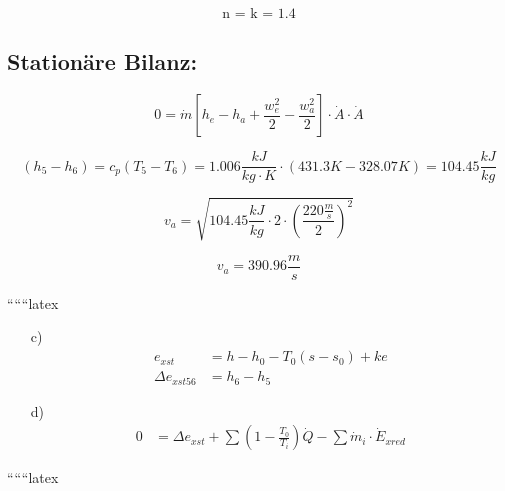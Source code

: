 \[
\text{n = k = 1.4}
\]

\subsection*{Stationäre Bilanz:}

\[
0 = \dot{m} \left[ h_e - h_a + \frac{w_e^2}{2} - \frac{w_a^2}{2} \right] \cdot \dot{A} \cdot \dot{A}
\]

\[
(h_5 - h_6) = c_p (T_5 - T_6) = 1.006 \frac{kJ}{kg \cdot K} \cdot (431.3 K - 328.07 K) = 104.45 \frac{kJ}{kg}
\]

\[
v_a = \sqrt{104.45 \frac{kJ}{kg} \cdot 2 \cdot \left( \frac{220 \frac{m}{s}}{2} \right)^2}
\]

\[
v_a = 390.96 \frac{m}{s}
\]

``````latex

\begin{itemize}
    \item[c)] 
    \begin{align*}
        e_{xst} &= h - h_0 - T_0 (s - s_0) + ke \\
        \Delta e_{xst56} &= h_6 - h_5
    \end{align*}
    
    \item[d)] 
    \begin{align*}
        0 &= \Delta e_{xst} + \sum \left(1 - \frac{T_0}{T_i}\right) \dot{Q} - \sum \dot{m}_i \cdot \dot{E}_{xred}
    \end{align*}
\end{itemize}

``````latex


